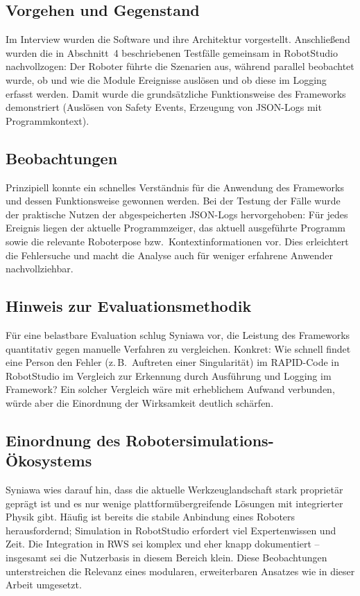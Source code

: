 \subsection{Vorgehen und Gegenstand}

Im Interview wurden die Software und ihre Architektur vorgestellt. Anschließend
wurden die in Abschnitt~4 beschriebenen Testfälle gemeinsam in RobotStudio
nachvollzogen: Der Roboter führte die Szenarien aus, während parallel beobachtet
wurde, ob und wie die Module Ereignisse auslösen und ob diese im Logging erfasst
werden. Damit wurde die grundsätzliche Funktionsweise des Frameworks
demonstriert (Auslösen von Safety Events, Erzeugung von JSON-Logs mit
Programmkontext).

\subsection{Beobachtungen}

Prinzipiell konnte ein schnelles Verständnis für die Anwendung des Frameworks
und dessen Funktionsweise gewonnen werden. Bei der Testung der Fälle wurde der
praktische Nutzen der abgespeicherten JSON-Logs hervorgehoben: Für jedes
Ereignis liegen der aktuelle Programmzeiger, das aktuell ausgeführte Programm
sowie die relevante Roboterpose bzw.\ Kontextinformationen vor. Dies erleichtert
die Fehlersuche und macht die Analyse auch für weniger erfahrene Anwender
nachvollziehbar.

\subsection{Hinweis zur Evaluationsmethodik}

Für eine belastbare Evaluation schlug Syniawa vor, die Leistung des Frameworks
quantitativ gegen manuelle Verfahren zu vergleichen. Konkret: Wie schnell
findet eine Person den Fehler (z.\,B.\ Auftreten einer Singularität) im
RAPID-Code in RobotStudio im Vergleich zur Erkennung durch Ausführung und
Logging im Framework? Ein solcher Vergleich wäre mit erheblichem Aufwand
verbunden, würde aber die Einordnung der Wirksamkeit deutlich schärfen.

\subsection{Einordnung des Robotersimulations-Ökosystems}

Syniawa wies darauf hin, dass die aktuelle Werkzeuglandschaft stark proprietär
geprägt ist und es nur wenige plattformübergreifende Lösungen mit integrierter
Physik gibt. Häufig ist bereits die stabile Anbindung eines Roboters
herausfordernd; Simulation in RobotStudio erfordert viel Expertenwissen
und Zeit. Die Integration in RWS sei komplex und eher knapp
dokumentiert – insgesamt sei die Nutzerbasis in diesem Bereich klein. Diese
Beobachtungen unterstreichen die Relevanz eines modularen, erweiterbaren
Ansatzes wie in dieser Arbeit umgesetzt.

